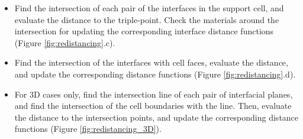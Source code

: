 \documentclass[]{article}
\begin{document}
\begin{itemize}
\begin{itemize}
\begin{itemize}
      support cell. Update the distance only if the 
      intersection point is within the support cell 
      (Figure \ref{fig:redistancing}.b).
     \item Find the intersection of each pair of the interfaces 
      in the support cell, and evaluate the distance 
      to the triple-point. Check the materials around the 
      intersection for updating the corresponding interface 
      distance functions (Figure \ref{fig:redistancing}.c).
     \item Find the intersection of the interfaces with 
      cell faces, evaluate the distance, and update the 
      corresponding distance functions (Figure \ref{fig:redistancing}.d).
     \item For 3D cases only, find the intersection line of 
       each pair of interfacial planes, and find the intersection 
      of the cell boundaries with the line. 
      Then, evaluate the distance to the intersection points, and update the corresponding distance functions (Figure \ref{fig:redistancing_3D}).
     \end{itemize}
   \end{itemize}
\end{itemize}
\end{document}
